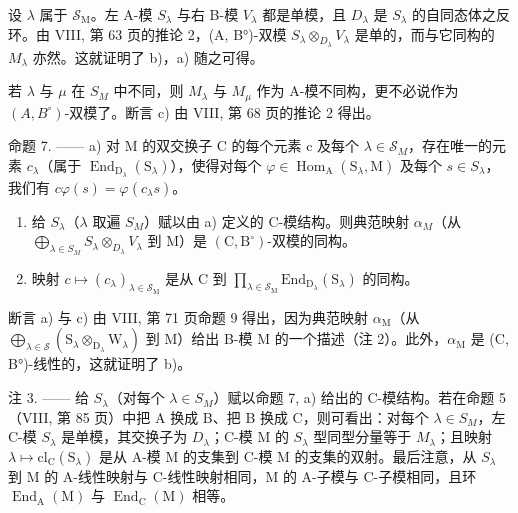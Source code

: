 设 \(\lambda\) 属于 \(\mathcal{S}_{\mathrm{M}}\)。左 A-模 \(S_{\lambda}\) 与右 B-模 \(V_{\lambda}\) 都是单模，且 \(D_{\lambda}\) 是 \(S_{\lambda}\) 的自同态体之反环。由 VIII, 第 63 页的推论 2，(A, B°)-双模 \(S_{\lambda} \otimes_{D_{\lambda}} V_{\lambda}\) 是单的，而与它同构的 \(M_{\lambda}\) 亦然。这就证明了 b)，a) 随之可得。

若 \(\lambda\) 与 \(\mu\) 在 \(S_{M}\) 中不同，则 \(M_{\lambda}\) 与 \(M_{\mu}\) 作为 A-模不同构，更不必说作为 \((A,B^{\circ})\)-双模了。断言 c) 由 VIII, 第 68 页的推论 2 得出。

命题 7. —— a) 对 M 的双交换子 C 的每个元素 c 及每个 \(\lambda\in\mathcal{S}_{M}\)，存在唯一的元素 \(c_{\lambda}\)（属于 \(\operatorname{End}_{\mathrm{D}_{\lambda}}(\mathrm{S}_{\lambda})\)），使得对每个 \(\varphi\in\operatorname{Hom}_{\mathrm{A}}(\mathrm{S}_{\lambda},\mathrm{M})\) 及每个 \(s\in S_{\lambda}\)，我们有 \(c\varphi(s)=\varphi(c_{\lambda}s)\)。

\begin{enumerate}
\def\labelenumi{\alph{enumi})}
\setcounter{enumi}{1}
\item
  给 \(S_{\lambda}\)（\(\lambda\) 取遍 \(S_{M}\)）赋以由 a) 定义的 C-模结构。则典范映射 \(\alpha_{M}\)（从 \(\bigoplus_{\lambda\in S_{M}}S_{\lambda}\otimes_{D_{\lambda}}V_{\lambda}\) 到 M）是 \((\mathrm{C},\mathrm{B}^{\circ})\)-双模的同构。
\item
  映射 \(c \mapsto (c_{\lambda})_{\lambda \in \mathcal{S}_{\mathrm{M}}}\) 是从 C 到 \(\prod_{\lambda \in \mathcal{S}_{\mathrm{M}}}\mathrm{End}_{\mathrm{D}_{\lambda}}(\mathrm{S}_{\lambda})\) 的同构。
\end{enumerate}

断言 a) 与 c) 由 VIII, 第 71 页命题 9 得出，因为典范映射 \(\alpha_{\mathrm{M}}\)（从 \(\bigoplus_{\lambda \in \mathcal{S}} (\mathrm{S}_{\lambda} \otimes_{\mathrm{D}_{\lambda}} \mathrm{W}_{\lambda})\) 到 M）给出 B-模 M 的一个描述（注 2）。此外，\(\alpha_{\mathrm{M}}\) 是 (C, B°)-线性的，这就证明了 b)。

注 3. —— 给 \(S_{\lambda}\)（对每个 \(\lambda \in S_{M}\)）赋以命题 7, a) 给出的 C-模结构。若在命题 5（VIII, 第 85 页）中把 A 换成 B、把 B 换成 C，则可看出：对每个 \(\lambda \in S_{M}\)，左 C-模 \(S_{\lambda}\) 是单模，其交换子为 \(D_{\lambda}\)；C-模 M 的 \(S_{\lambda}\) 型同型分量等于 \(M_{\lambda}\)；且映射 \(\lambda \mapsto \mathrm{cl}_{\mathrm{C}}(\mathrm{S}_{\lambda})\) 是从 A-模 M 的支集到 C-模 M 的支集的双射。最后注意，从 \(S_{\lambda}\) 到 M 的 A-线性映射与 C-线性映射相同，M 的 A-子模与 C-子模相同，且环 \(\operatorname{End}_{\mathrm{A}}(\mathrm{M})\) 与 \(\operatorname{End}_{\mathrm{C}}(\mathrm{M})\) 相等。

